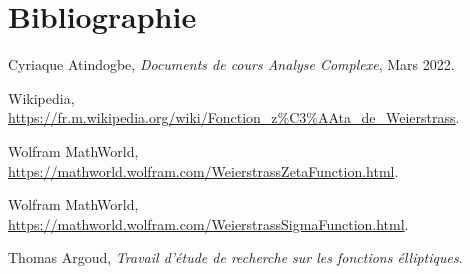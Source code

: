 \documentclass[12pt]{article}
\begin{document}
            \section*{Bibliographie}
            
            \begin{thebibliography}{9}
            	
            	Cyriaque Atindogbe, \textit{Documents de cours Analyse Complexe}, Mars 2022.
            	
            	Wikipedia, \url{https://fr.m.wikipedia.org/wiki/Fonction_z%C3%AAta_de_Weierstrass}.
            	
            	Wolfram MathWorld, \url{https://mathworld.wolfram.com/WeierstrassZetaFunction.html}.
            	
            	Wolfram MathWorld, \url{https://mathworld.wolfram.com/WeierstrassSigmaFunction.html}.
            	
            	Thomas Argoud, \textit{Travail d'étude de recherche sur les fonctions élliptiques}.
            	
            \end{thebibliography}
\end{document}
